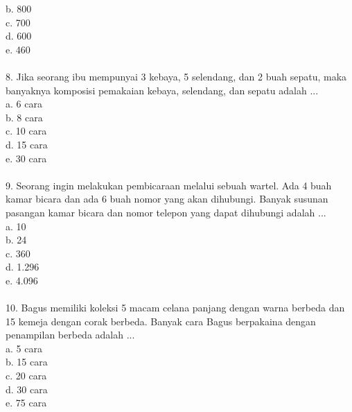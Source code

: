 \documentclass[11pt,fleqn]{book} %
\begin{document}
b.	800\\

c.	700\\

d.	600\\

e.	460\\
\\

8. Jika seorang ibu mempunyai 3 kebaya, 5 selendang, dan 2 buah sepatu, maka banyaknya komposisi pemakaian kebaya, selendang, dan sepatu adalah ...\\

a.	6 cara\\

b.	8 cara\\

c.	10 cara\\

d.	15 cara\\

e.	30 cara\\
\\

9. Seorang ingin melakukan pembicaraan melalui sebuah wartel. Ada 4 buah kamar bicara dan ada 6 buah nomor yang akan dihubungi. Banyak susunan pasangan kamar bicara dan nomor telepon yang dapat dihubungi adalah ...\\ 

a.	10\\

b.	24\\

c.	360\\

d.	1.296\\

e.	4.096\\
\\

10. Bagus memiliki koleksi 5 macam celana panjang dengan warna berbeda dan 15 kemeja dengan corak berbeda. Banyak cara Bagus berpakaina dengan penampilan berbeda adalah ...\\ 

a.	5 cara\\

b.	15 cara\\

c.	20 cara\\

d.	30 cara\\

e.	75 cara\\
\\
\end{document}
